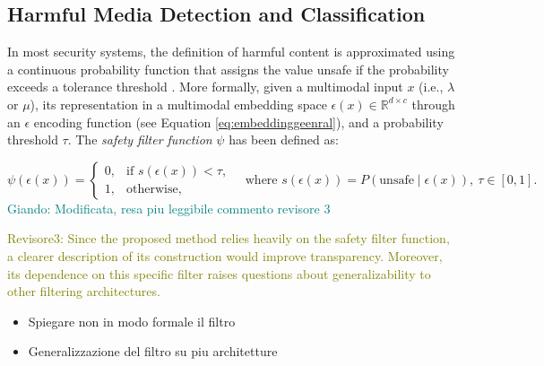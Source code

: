 \documentclass[acmsmall]{acmart}
\newcommand{\giando}[1]{\textcolor{teal}{Giando: #1}}
\newcommand{\revthree}[1]{\textcolor{olive}{Revisore3: #1}}
\begin{document}
\subsection{Harmful Media Detection and Classification}\label{subsec:harm_detection}
In most security systems, the definition of harmful content is approximated using a continuous probability function that assigns the value unsafe if the probability exceeds a tolerance threshold \cite{vidgen2020directions,OpenAIModerationAPI,AzureModerationAPI,GoogleAIModerationAPI}. More formally, given a multimodal input $x$ (i.e., $\lambda$ or $\mu$), its representation in a multimodal embedding space $\epsilon(x)\in\mathbb{R}^{d \times c}$ through an $\epsilon$ encoding function (see Equation \ref{eq:embeddinggeenral}), and a probability threshold $\tau$. The \textit{safety filter function} $\psi$ has been defined as:

\begin{equation}\label{eq:filter_function}
\psi(\epsilon(x)) =
\begin{cases}
0, & \text{if } s(\epsilon(x)) < \tau,\\
1, & \text{otherwise},
\end{cases}
\quad
\text{where } s(\epsilon(x)) = P(\text{unsafe} \mid \epsilon(x)),\ \tau \in [0,1].
\end{equation}\giando{Modificata, resa piu leggibile commento revisore 3}


\revthree{Since the proposed method relies heavily on the safety filter function, a clearer description of its construction would improve transparency. Moreover, its dependence on this specific filter raises questions about generalizability to other filtering architectures.}
\begin{itemize}
    \item Spiegare non in modo formale il filtro 
    \item Generalizzazione del filtro su piu architetture
\end{itemize}
\end{document}
